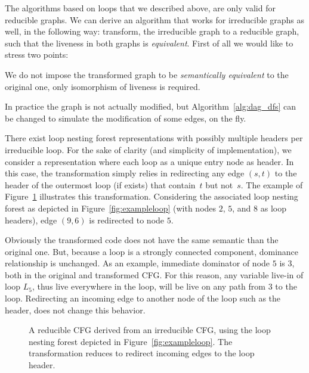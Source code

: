 The algorithms based on loops that we described above, are only valid for reducible graphs.
We can derive an algorithm that works for irreducible graphs as well, in the following way:
transform, the irreducible graph to a reducible graph, such that the liveness in both graphs is \emph{equivalent}.
First of all we would like to stress two points:
\begin{asparaenum}[(1)]
\item We do not impose the transformed graph to be \emph{semantically equivalent} to the original one, only isomorphism of liveness is required. 
\item In practice the graph is not actually modified, but Algorithm~\ref{alg:dag_dfs} can be changed to simulate the modification of some edges, on the fly.
\end{asparaenum}

There exist loop nesting forest representations with possibly multiple headers per irreducible loop.
For the sake of clarity (and simplicity of implementation), we consider a representation where each loop as a unique entry node as header.
In this case, the transformation simply relies in redirecting any edge $(s,t)$ to the header of the outermost loop (if exists) that contain~$t$ but not~$s$.
The example of Figure~\ref{fig:examplecfg} illustrates this transformation.
Considering the associated loop nesting forest as depicted in Figure~\ref{fig:exampleloop} (with nodes $2$, $5$, and $8$ as loop headers), edge $(9,6)$ is redirected to node $5$.

Obviously the transformed code does not have the same semantic than the original one.
But, because a loop is a strongly connected component, dominance relationship is unchanged.
As an example, immediate dominator of node $5$ is $3$, both in the original and transformed CFG.
For this reason, any variable live-in of loop $L_5$, thus live everywhere in the loop, will be live on any path from $3$ to the loop.
Redirecting an incoming edge to another node of the loop such as the header, does not change this behavior.

\begin{figure}[t]
  \begin{center}
    \hspace{4mm}
  \end{center}
  \caption{%
	  A reducible CFG derived from an irreducible CFG, using the loop nesting forest depicted in Figure~\ref{fig:exampleloop}.
	  The transformation reduces to redirect incoming edges to the loop header.}
  \label{fig:examplecfg}
\end{figure}

